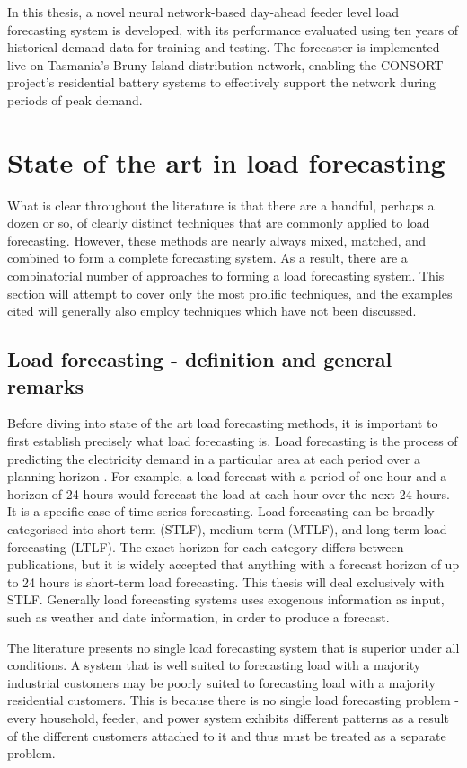 In this thesis, a novel neural network-based day-ahead feeder level load forecasting system is developed, with its performance evaluated using ten years of historical demand data for training and testing. The forecaster is implemented live on Tasmania's Bruny Island distribution network, enabling the CONSORT project's residential battery systems to effectively support the network during periods of peak demand.

\section{State of the art in load forecasting}
What is clear throughout the literature is that there are a handful, perhaps a dozen or so, of clearly distinct techniques that are commonly applied to load forecasting.
However, these methods are nearly always mixed, matched, and combined to form a complete forecasting system.
As a result, there are a combinatorial number of approaches to forming a load forecasting system.
This section will attempt to cover only the most prolific techniques, and the examples cited will generally also employ techniques which have not been discussed. 

\subsection{Load forecasting - definition and general remarks}
Before diving into state of the art load forecasting methods, it is important to first establish precisely what load forecasting is.
Load forecasting is the process of predicting the electricity demand in a particular area at each period over a planning horizon \citep{Weron2006}.
For example, a load forecast with a period of one hour and a horizon of 24 hours would forecast the load at each hour over the next 24 hours.
It is a specific case of time series forecasting.
Load forecasting can be broadly categorised into short-term (STLF), medium-term (MTLF), and long-term load forecasting (LTLF).
The exact horizon for each category differs between publications, but it is widely accepted that anything with a forecast horizon of up to 24 hours is short-term load forecasting.
This thesis will deal exclusively with STLF.
Generally load forecasting systems uses exogenous information as input, such as weather and date information, in order to produce a forecast.

The literature presents no single load forecasting system that is superior under all conditions.
A system that is well suited to forecasting load with a majority industrial customers may be poorly suited to forecasting load with a majority residential customers.
This is because there is no single load forecasting problem - every household, feeder, and  power system exhibits different patterns as a result of the different customers attached to it and thus must be treated as a separate problem.


